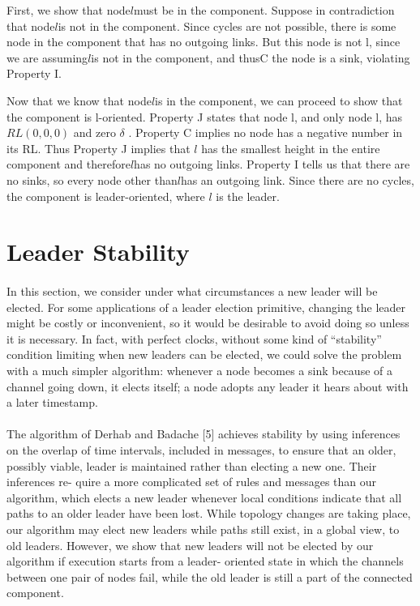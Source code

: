 First, we show that node$ l $must be in the component. Suppose in contradiction that node$ l $is not in the component. Since cycles are not possible, there is some node in the component that has no outgoing links. But this node is not l, since we are assuming$ l $is not in the component, and thusC the node is a sink, violating Property I.

Now that we know that node$ l $is in the component, we can proceed to show that the component is l-oriented. Property J states that node l, and only node l, has $RL (0,0,0)$ and zero $\delta$ . Property C implies no node has a negative number in its RL. Thus Property J implies that $ l $ has the smallest height in the entire component and therefore$ l $has no outgoing links. Property I tells us that there are no sinks, so every node other than$ l $has an outgoing link. Since there are no cycles, the component is leader-oriented, where $ l $ is the leader.
\section{Leader Stability}

\paragraph{}In this section, we consider under what circumstances a new leader will be elected. For some applications of a leader election primitive, changing the leader might be costly or inconvenient, so it would be desirable to avoid doing so unless it is necessary. In fact, with perfect clocks, without some kind of “stability” condition limiting when new leaders can be elected, we could solve the problem with a much simpler algorithm: whenever a node becomes a sink because of a channel going down, it elects itself; a node adopts any leader it hears about with a later timestamp.
\paragraph{}The algorithm of Derhab and Badache [5] achieves stability by using inferences on the overlap of time intervals, included in messages, to ensure that an older, possibly viable, leader is maintained rather than electing a new one. Their inferences re- quire a more complicated set of rules and messages than our algorithm, which elects a new leader whenever local conditions indicate that all paths to an older leader have been lost. While topology changes are taking place, our algorithm may elect new leaders while paths still exist, in a global view, to old leaders. However, we show that new leaders will not be elected by our algorithm if execution starts from a leader- oriented state in which the channels between one pair of nodes fail, while the old leader is still a part of the connected component.
